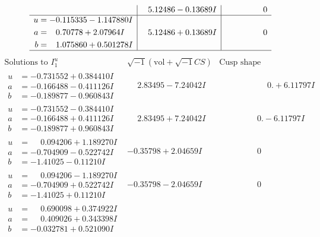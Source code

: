 \documentclass[1p]{elsarticle_modified}
\theoremstyle{definition}
\newcommand{\I}{\sqrt{-1}}
\begin{document}
$$\begin{array}{c|c|c}
 & \phantom{-}5.12486 - 0.13689 I & \phantom{-0.000000 } 0 \\ \hline\begin{aligned}
u &= -0.115335 - 1.147880 I \\
a &= \phantom{-}0.70778 + 2.07964 I \\
b &= \phantom{-}1.075860 + 0.501278 I\end{aligned}
 & \phantom{-}5.12486 + 0.13689 I & \phantom{-0.000000 } 0\\
 \hline 
 \end{array}$$\newpage$$\begin{array}{c|c|c}  
\text{Solutions to }I^u_{1}& \I (\text{vol} + \sqrt{-1}CS) & \text{Cusp shape}\\
 \hline 
\begin{aligned}
u &= -0.731552 + 0.384410 I \\
a &= -0.166488 - 0.411126 I \\
b &= -0.189877 - 0.960843 I\end{aligned}
 & \phantom{-}2.83495 - 7.24042 I & \phantom{-0.000000 -}0. + 6.11797 I \\ \hline\begin{aligned}
u &= -0.731552 - 0.384410 I \\
a &= -0.166488 + 0.411126 I \\
b &= -0.189877 + 0.960843 I\end{aligned}
 & \phantom{-}2.83495 + 7.24042 I & \phantom{-0.000000 } 0. - 6.11797 I \\ \hline\begin{aligned}
u &= \phantom{-}0.094206 + 1.189270 I \\
a &= -0.704909 - 0.522742 I \\
b &= -1.41025 - 0.11210 I\end{aligned}
 & -0.35798 + 2.04659 I & \phantom{-0.000000 } 0 \\ \hline\begin{aligned}
u &= \phantom{-}0.094206 - 1.189270 I \\
a &= -0.704909 + 0.522742 I \\
b &= -1.41025 + 0.11210 I\end{aligned}
 & -0.35798 - 2.04659 I & \phantom{-0.000000 } 0 \\ \hline\begin{aligned}
u &= \phantom{-}0.690098 + 0.374922 I \\
a &= \phantom{-}0.409026 + 0.343398 I \\
b &= -0.032781 + 0.521090 I\end{aligned}

\end{array}$$
\end{document}
